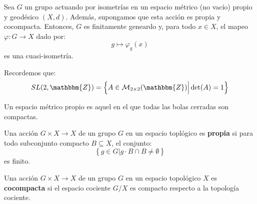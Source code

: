 \documentclass[12pt]{report}
\newcounter{it}
\theoremstyle{largebreak}
\newcommand\cf[3]{\ensuremath{#1:#2\rightarrow#3}}
\newcommand{\bbm}[1]{\ensuremath{\mathbbm{#1}}}
\begin{document}
    \begin{lema}
        Sea $G$ un grupo actuando por isometrías en un espacio métrico (no vacío) propio y geodésico $(X,d)$. Además, supongamos que esta acción es propia y cocompacta. Entonces, $G$ es finitamente geneardo y, para todo $x\in X$, el mapeo $\cf{\varphi}{G}{X}$ dado por:
        \begin{equation*}
            g\mapsto \varphi_g(x)
        \end{equation*}
        es una cuasi-isometría.
    \end{lema}

    \begin{obs}
        Recordemos que:
        \begin{equation*}
            SL(2,\bbm{Z})=\left\{A\in\mathcal{M}_{ 2\times 2}(\bbm{Z})\Big|\det(A)=1 \right\}
        \end{equation*}
        
        Un espacio métrico propio es aquel en el que todas las bolas cerradas son compactas.
    \end{obs}

    \begin{mydef}
        Una acción $G\times X\rightarrow X$ de un grupo $G$ en un espacio toplógico es \textbf{propia} si para todo subconjunto compacto $B\subseteq X$, el conjunto:
        \begin{equation*}
            \left\{g\in G\Big|g\cdot B\cap B\neq\emptyset \right\}
        \end{equation*}
        es finito.
    \end{mydef}

    \begin{mydef}
        Una acción $G\times X\rightarrow X$ de un grupo $G$ en un espacio topológico $X$ es \textbf{cocompacta} si el espacio cociente $G/X$ es compacto respecto a la topología cociente. 
    \end{mydef}
\end{document}
